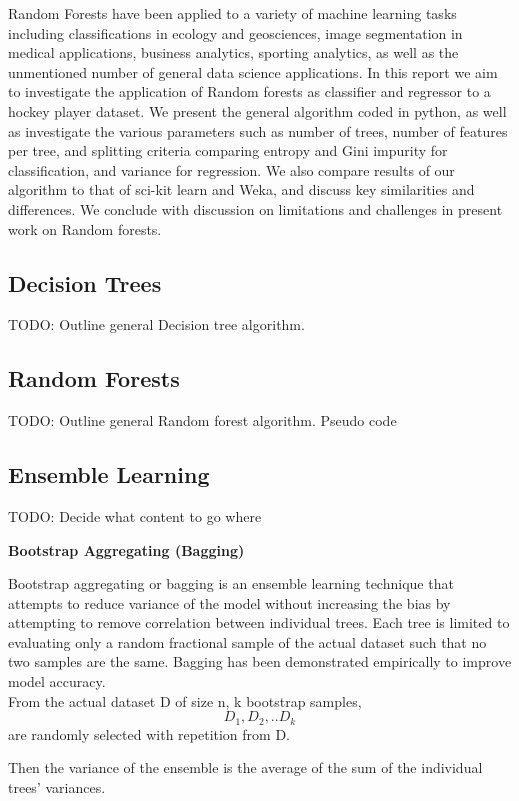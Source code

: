 \documentclass{article} %
\begin{document}
Random Forests have been applied to a variety of machine learning tasks including classifications in ecology and geosciences, image segmentation in medical applications, business analytics, sporting analytics, as well as the unmentioned number of general data science applications. \cite{Cutler2007, Harris2015, Luo2017, Ghatasheh2014, Lock2014} In this report we aim to investigate the application of Random forests as classifier and regressor to a hockey player dataset. We present the general algorithm coded in python, as well as investigate the various parameters such as number of trees, number of features per tree, and splitting criteria comparing entropy and Gini impurity for classification, and variance for regression. We also compare results of our algorithm to that of sci-kit learn and Weka, and discuss key similarities and differences. We conclude with discussion on limitations and challenges in present work on Random forests.

\subsection{Decision Trees}
TODO: Outline general Decision tree algorithm.

\subsection{Random Forests}
TODO: Outline general Random forest algorithm. Pseudo code

\subsection{Ensemble Learning}
TODO: Decide what content to go where

\textbf{Bootstrap Aggregating (Bagging)}

Bootstrap aggregating or bagging is an ensemble learning technique that attempts to reduce variance of the model without increasing the bias by attempting to remove correlation between individual trees. Each tree is limited to evaluating only a random fractional sample of the actual dataset such that no two samples are the same. Bagging has been demonstrated empirically to improve model accuracy. \cite{Aslam07}\\

From the actual dataset D of size n, k bootstrap samples, \[ D_1,D_2,..D_k  \] are randomly selected with repetition from D.

Then the variance of the ensemble is the average of the sum of the individual trees' variances.
\end{document}
